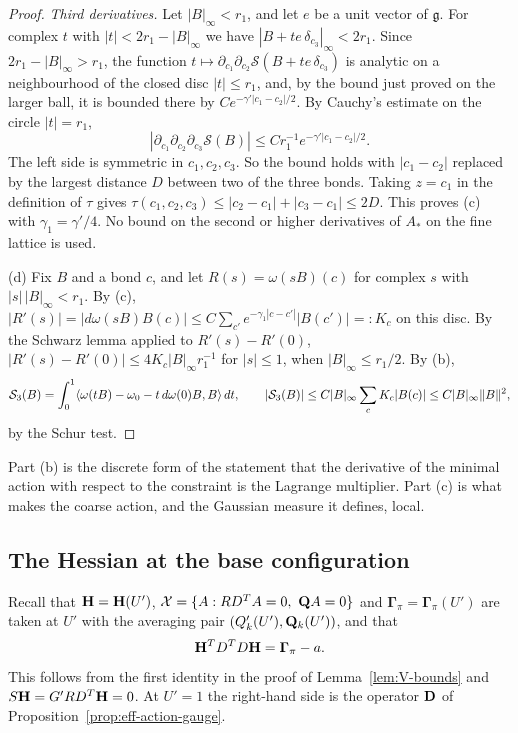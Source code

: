 \begin{proof}
\emph{Third derivatives.} Let $|B|_\infty<r_1$, and let $e$ be a unit vector of $\mathfrak g$. For complex $t$ with $|t|<2r_1-|B|_\infty$ we have $|B+te\,\delta_{c_3}|_\infty<2r_1$. Since $2r_1-|B|_\infty>r_1$, the function $t\mapsto\partial_{c_1}\partial_{c_2}\mathcal S(B+te\,\delta_{c_3})$ is analytic on a neighbourhood of the closed disc $|t|\le r_1$, and, by the bound just proved on the larger ball, it is bounded there by $Ce^{-\gamma'|c_1-c_2|/2}$. By Cauchy's estimate on the circle $|t|=r_1$,
\[
|\partial_{c_1}\partial_{c_2}\partial_{c_3}\mathcal S(B)|\le Cr_1^{-1}e^{-\gamma'|c_1-c_2|/2}.
\]
The left side is symmetric in $c_1,c_2,c_3$. So the bound holds with $|c_1-c_2|$ replaced by the largest distance $D$ between two of the three bonds. Taking $z=c_1$ in the definition of $\tau$ gives $\tau(c_1,c_2,c_3)\le|c_2-c_1|+|c_3-c_1|\le2D$. This proves (c) with $\gamma_1=\gamma'/4$. No bound on the second or higher derivatives of $A_*$ on the fine lattice is used.

(d) Fix $B$ and a bond $c$, and let $R(s)=\omega(sB)(c)$ for complex $s$ with $|s|\,|B|_\infty<r_1$. By (c), $|R'(s)|=|d\omega(sB)B(c)|\le C\sum_{c'}e^{-\gamma_1|c-c'|}|B(c')|=:K_c$ on this disc. By the Schwarz lemma applied to $R'(s)-R'(0)$, $|R'(s)-R'(0)|\le4K_c|B|_\infty r_1^{-1}$ for $|s|\le1$, when $|B|_\infty\le r_1/2$. By (b),
\[
\mathcal S_3(B)=\int_0^1\langle \omega(tB)-\omega_0-t\,d\omega(0)B,B\rangle\,dt,\qquad|\mathcal S_3(B)|\le C|B|_\infty\sum_c K_c|B(c)|\le C|B|_\infty\|B\|^2,
\]
by the Schur test.
\end{proof}

Part (b) is the discrete form of the statement that the derivative of the minimal action with respect to the constraint is the Lagrange multiplier. Part (c) is what makes the coarse action, and the Gaussian measure it defines, local.

\subsection{The Hessian at the base configuration}\label{ss:33.2}

Recall that $\mathbf H=\mathbf H(U')$, $\mathcal X=\{A:RD^TA=0,\ \mathbf Q A=0\}$ and $\boldsymbol\Gamma_\pi=\boldsymbol\Gamma_\pi(U')$ are taken at $U'$ with the averaging pair $(Q'_k(U'),\mathbf Q_k(U'))$, and that
\begin{equation}\label{eq:H-effective}
\mathbf H^TD^TD\mathbf H=\boldsymbol\Gamma_\pi-a .
\end{equation}
This follows from the first identity in the proof of Lemma~\ref{lem:V-bounds} and $S\mathbf H=G'RD^T\mathbf H=0$. At $U'=1$ the right-hand side is the operator $\mathbf D$ of Proposition~\ref{prop:eff-action-gauge}.

